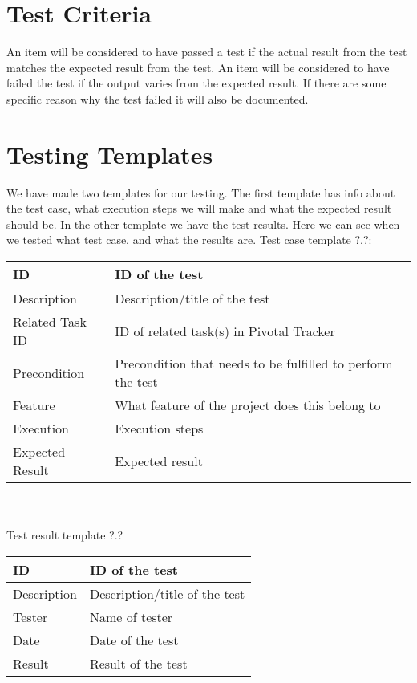\documentclass{report}
\begin{document}
\section{Test Criteria} \label{sec:test_criteria}
An item will be considered to have passed a test if the actual result from the test matches the expected result from the test. An item will be considered to have failed the test if the output varies from the expected result. If there are some specific reason why the test failed it will also be documented.

\section{Testing Templates} \label{sec:testing_templates}
We have made two templates for our testing. The first template has info about the test case, what execution steps we will make and what the expected result should be. In the other template we have the test results. Here we can see when we tested what test case, and what the results are.
Test case template ?.?:\\
\begin{tabular}{| l | p{9 cm} |} \hline
ID & ID of the test \\ \hline
Description & Description/title of the test \\ \hline
Related Task ID & ID of related task(s) in Pivotal Tracker \\ \hline %
Precondition & Precondition that needs to be fulfilled to perform the test \\ \hline
Feature & What feature of the project does this belong to \\ \hline
Execution & Execution steps\\ \hline
Expected Result & Expected result\\ \hline
\end{tabular}\\\\
Test result template ?.?\\
\begin{tabular}{| l | l |} \hline
ID & ID of the test \\ \hline
Description & Description/title of the test \\ \hline
Tester & Name of tester \\ \hline
Date & Date of the test\\ \hline
Result & Result of the test\\ \hline
\end{tabular}
\end{document}

